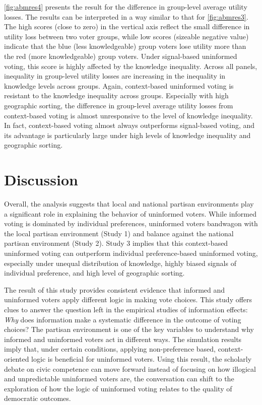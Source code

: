 \documentclass[letterpaper, 12pt]{article}
\begin{document}
    \par \autoref{fig:abmres4} presents the result for the difference in group-level average utility losses. The results can be interpreted in a way similar to that for \autoref{fig:abmres3}. The high scores (close to zero) in the vertical axis reflect the small difference in utility loss between two voter groups, while low scores (sizeable negative value) indicate that the blue (less knowledgeable) group voters lose utility more than the red (more knowledgeable) group voters. Under signal-based uninformed voting, this score is highly affected by the knowledge inequality. Across all panels, inequality in group-level utility losses are increasing in the inequality in knowledge levels across groups. Again, context-based uninformed voting is resistant to the knowledge inequality across groups. Especially with high geographic sorting, the difference in group-level average utility losses from context-based voting is almost unresponsive to the level of knowledge inequality. In fact, context-based voting almost always outperforms signal-based voting, and its advantage is particularly large under high levels of knowledge inequality and geographic sorting.
    
    \section*{Discussion}
    
    \par Overall, the analysis suggests that local and national partisan environments play a significant role in explaining the behavior of uninformed voters. While informed voting is dominated by individual preferences, uninformed voters bandwagon with the local partisan environment (Study 1) and balance against the national partisan environment (Study 2). Study 3 implies that this context-based uninformed voting can outperform individual preference-based uninformed voting, especially under unequal distribution of knowledge, highly biased signals of individual preference, and high level of geographic sorting. 
            
    \par The result of this study provides consistent evidence that informed and uninformed voters apply different logic in making vote choices. This study offers clues to answer the question left in the empirical studies of information effects: \textit{Why} does information make a systematic difference in the outcome of voting choices? The partisan environment is one of the key variables to understand why informed and uninformed voters act in different ways. The simulation results imply that, under certain conditions, applying non-preference based, context-oriented logic is beneficial for uninformed voters. Using this result, the scholarly debate on civic competence can move forward instead of focusing on how illogical and unpredictable uninformed voters are, the conversation can shift to the exploration of how the logic of uninformed voting relates to the quality of democratic outcomes. 
    
\end{document}
